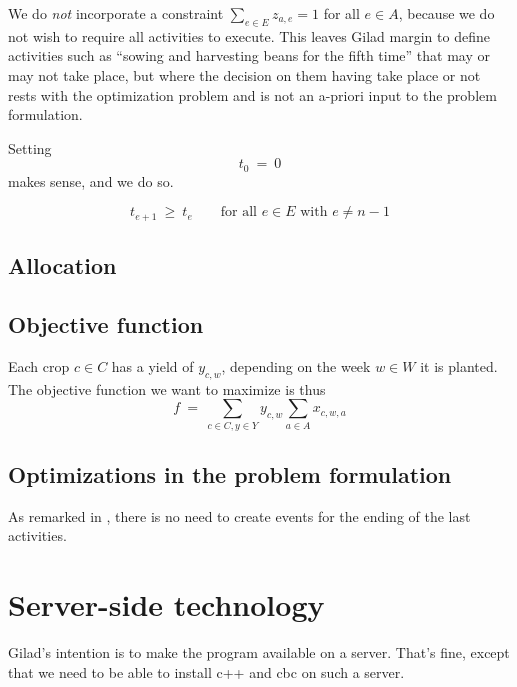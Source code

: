 \documentclass[11pt]{amsart}
\numberwithin{equation}{section}
\begin{document}
\begin{description}

\item[Not all activities have to execute] We do \emph{not} incorporate
  a constraint $\sum_{e\in E} z_{a,e}=1$ for all $e\in A$, because we
  do not wish to require all activities to execute. This leaves Gilad margin
  to define activities such as ``sowing and harvesting beans for the
  fifth time'' that may or may not take place, but where the decision
  on them having take place or not rests with the optimization problem
  and is not an a-priori input to the problem formulation.

\item[Start at time 0] Setting
  \[
     t_0
     \ = \
     0
  \]
  makes sense, and we do so.

\item[Ordering the execution starts]
  \[
     t_{e+1} 
     \ \ge \
     t_e
     \qquad\text{for all }
      e\in E\text{ with }
      e\ne n-1
  \]

\item 
\end{description}


\subsection{Allocation}


\subsection{Objective function}

Each crop $c\in C$ has a yield of  $y_{c,w}$, depending on the week
$w\in W$ it is planted. 
The objective function we want to  maximize is thus
\[
   f 
   \ = \
   \sum_{c\in C, y\in Y} y_{c,w} \sum_{a\in A} x_{c,w,a}
\]

\subsection{Optimizations in the problem formulation}

As remarked in \cite{artigues-etal11}, there is no need to create
events for the ending of the last activities. 

\section{Server-side technology}

Gilad's intention is to make the program available on a server. That's
fine, except that we need to be able to install c++ and cbc on such a server.



\end{document}
